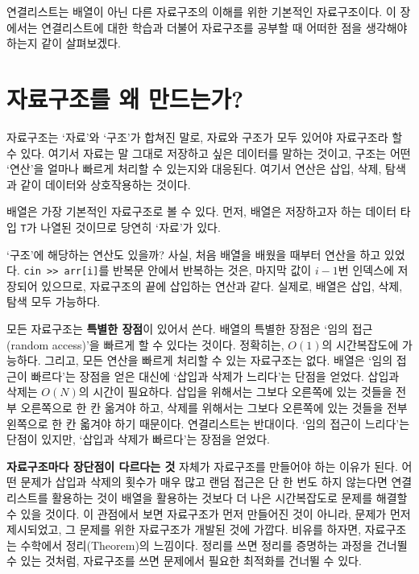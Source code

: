 연결리스트는 배열이 아닌 다른 자료구조의 이해를 위한 기본적인 자료구조이다. 이 장에서는 연결리스트에 대한 학습과 더불어 자료구조를 공부할 때 어떠한 점을 생각해야 하는지 같이 살펴보겠다.

\section{자료구조를 왜 만드는가?}
자료구조는 `자료'와 `구조'가 합쳐진 말로, 자료와 구조가 모두 있어야 자료구조라 할 수 있다. 여기서 자료는 말 그대로 저장하고 싶은 데이터를 말하는 것이고, 구조는 어떤 `연산'을 얼마나 빠르게 처리할 수 있는지와 대응된다. 여기서 연산은 삽입, 삭제, 탐색과 같이 데이터와 상호작용하는 것이다.

배열은 가장 기본적인 자료구조로 볼 수 있다. 먼저, 배열은 저장하고자 하는 데이터 타입 \texttt{T}가 나열된 것이므로 당연히 `자료'가 있다.

\begin{figure}[h]
    \centering
\end{figure}

`구조'에 해당하는 연산도 있을까? 사실, 처음 배열을 배웠을 때부터 연산을 하고 있었다. \texttt{cin >> arr[i]}를 반복문 안에서 반복하는 것은, 마지막 값이 $i-1$번 인덱스에 저장되어 있으므로, 자료구조의 끝에 삽입하는 연산과 같다. 실제로, 배열은 삽입, 삭제, 탐색 모두 가능하다.

모든 자료구조는 \textbf{특별한 장점}이 있어서 쓴다. 배열의 특별한 장점은 `임의 접근(random access)'을 빠르게 할 수 있다는 것이다. 정확히는, $O(1)$의 시간복잡도에 가능하다. 그리고, 모든 연산을 빠르게 처리할 수 있는 자료구조는 없다. 배열은 `임의 접근이 빠르다'는 장점을 얻은 대신에 `삽입과 삭제가 느리다'는 단점을 얻었다. 삽입과 삭제는 $O(N)$의 시간이 필요하다. 삽입을 위해서는 그보다 오른쪽에 있는 것들을 전부 오른쪽으로 한 칸 옮겨야 하고, 삭제를 위해서는 그보다 오른쪽에 있는 것들을 전부 왼쪽으로 한 칸 옯겨야 하기 때문이다. 연결리스트는 반대이다. `임의 접근이 느리다'는 단점이 있지만, `삽입과 삭제가 빠르다'는 장점을 얻었다.

\textbf{자료구조마다 장단점이 다르다는 것} 자체가 자료구조를 만들어야 하는 이유가 된다. 어떤 문제가 삽입과 삭제의 횟수가 매우 많고 랜덤 접근은 단 한 번도 하지 않는다면 연결리스트를 활용하는 것이 배열을 활용하는 것보다 더 나은 시간복잡도로 문제를 해결할 수 있을 것이다. 이 관점에서 보면 자료구조가 먼저 만들어진 것이 아니라, 문제가 먼저 제시되었고, 그 문제를 위한 자료구조가 개발된 것에 가깝다. 비유를 하자면, 자료구조는 수학에서 정리(Theorem)의 느낌이다. 정리를 쓰면 정리를 증명하는 과정을 건너뛸 수 있는 것처럼, 자료구조를 쓰면 문제에서 필요한 최적화를 건너뛸 수 있다.

